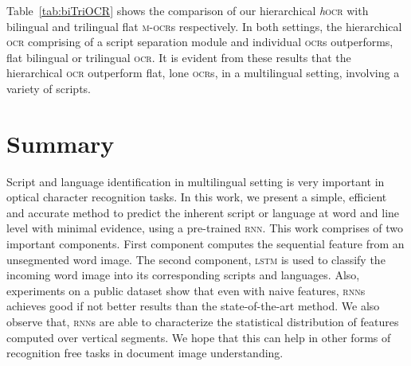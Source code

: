 Table~\ref{tab:biTriOCR} shows the comparison of our hierarchical \textit{h}\textsc{ocr} with bilingual and trilingual flat \textsc{m-ocr}s respectively. In both settings, the hierarchical \textsc{ocr} comprising of a script separation module and individual \textsc{ocr}s outperforms, flat bilingual or trilingual \textsc{ocr}. It is evident from these results that the hierarchical \textsc{ocr} outperform flat, lone \textsc{ocr}s, in a multilingual setting, involving a variety of scripts.

\section{Summary}
Script and language identification in multilingual setting is very important in optical character recognition tasks. In this work, we present a simple, efficient and accurate method to predict the inherent script or language at word and line level with minimal evidence, using a pre-trained \textsc{rnn}. This work comprises of two important components. First component computes the sequential feature from an unsegmented word image. The second component, \textsc{lstm} is used to classify the incoming word image into its corresponding  scripts and languages. Also, experiments on a public dataset show that even with naive features, \textsc{rnn}s achieves good if not better results than the state-of-the-art method. We also observe that, \textsc{rnn}s are able to characterize the statistical distribution of features computed over vertical segments. We hope that this can help in other forms of recognition free tasks in document image understanding.